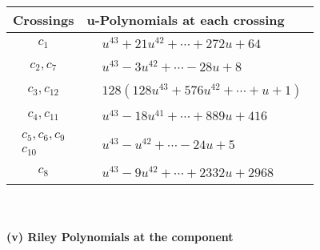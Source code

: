 \documentclass[1p]{elsarticle_modified}
\theoremstyle{definition}
\begin{document}
\begin{tabular}{m{50pt}|m{274pt}}
Crossings & \hspace{64pt}u-Polynomials at each crossing \\
\hline $$\begin{aligned}c_{1}\end{aligned}$$&$\begin{aligned}
&u^{43}+21 u^{42}+\cdots+272 u+64
\end{aligned}$\\
\hline $$\begin{aligned}c_{2},c_{7}\end{aligned}$$&$\begin{aligned}
&u^{43}-3 u^{42}+\cdots-28 u+8
\end{aligned}$\\
\hline $$\begin{aligned}c_{3},c_{12}\end{aligned}$$&$\begin{aligned}
&128(128 u^{43}+576 u^{42}+\cdots+u+1)
\end{aligned}$\\
\hline $$\begin{aligned}c_{4},c_{11}\end{aligned}$$&$\begin{aligned}
&u^{43}-18 u^{41}+\cdots+889 u+416
\end{aligned}$\\
\hline $$\begin{aligned}c_{5},c_{6},c_{9}\\c_{10}\end{aligned}$$&$\begin{aligned}
&u^{43}- u^{42}+\cdots-24 u+5
\end{aligned}$\\
\hline $$\begin{aligned}c_{8}\end{aligned}$$&$\begin{aligned}
&u^{43}-9 u^{42}+\cdots+2332 u+2968
\end{aligned}$\\
\hline
\end{tabular}\\~\\
\newpage\renewcommand{\arraystretch}{1}
\flushleft \textbf{(v) Riley Polynomials at the component}\newline \\
\end{document}
